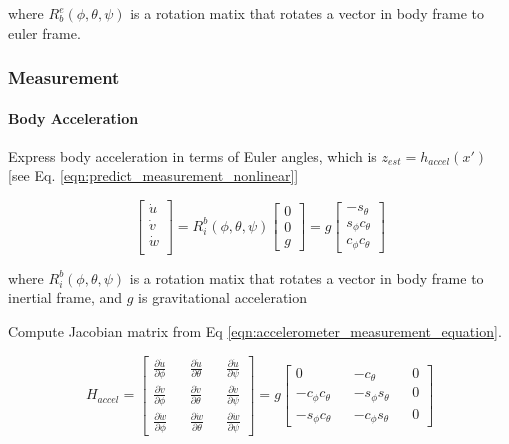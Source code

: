 \documentclass[]{article}
\begin{document}
where $R_b^e(\phi, \theta, \psi)$ is a rotation matix that rotates a vector in body frame to euler frame.

\subsubsection{Measurement}
\paragraph{Body Acceleration}
Express body acceleration in terms of Euler angles, which is $z_{est} = h_{accel}(x')$ [see Eq. \eqref{eqn:predict_measurement_nonlinear}]

\begin{equation}
	\begin{bmatrix}
		\dot{u} \\
		\dot{v} \\
		\dot{w} \\
	\end{bmatrix} = 
	R_{i}^{b}(\phi, \theta, \psi)
	\begin{bmatrix}
		0 \\
		0 \\
		g
	\end{bmatrix} = g
	\begin{bmatrix}
		-s_\theta \\
		s_\phi c_\theta \\
		c_\phi c_\theta
	\end{bmatrix}\label{eqn:accelerometer_measurement_equation}
\end{equation}

where $R_{i}^{b}(\phi, \theta, \psi)$ is a rotation matix that rotates a vector in body frame to inertial frame, and $g$ is gravitational acceleration

Compute Jacobian matrix from Eq \eqref{eqn:accelerometer_measurement_equation}.

\begin{equation}
	H_{accel} = 
	\begin{bmatrix}
		\frac{\partial \dot{u}}{\partial \phi} && \frac{\partial \dot{u}}{\partial \theta} && \frac{\partial \dot{u}}{\partial \psi} \\
		\frac{\partial \dot{v}}{\partial \phi} && \frac{\partial \dot{v}}{\partial \theta} && \frac{\partial \dot{v}}{\partial \psi} \\
		\frac{\partial \dot{w}}{\partial \phi} && \frac{\partial \dot{w}}{\partial \theta} && \frac{\partial \dot{w}}{\partial \psi}
	\end{bmatrix} = 
	g \begin{bmatrix}
		0 && -c_\theta && 0 \\
		-c_\phi c_\theta && -s_\phi s_\theta && 0 \\
		-s_\phi c_\theta && -c_\phi s_\theta && 0
	\end{bmatrix}\label{eqn:H_accelerometer}
\end{equation}
\end{document}
